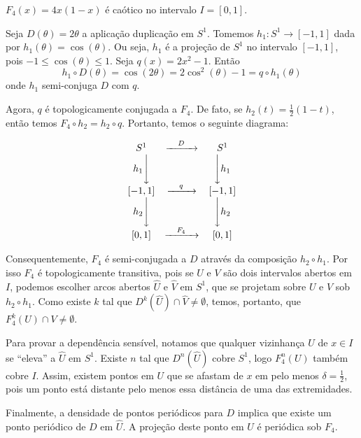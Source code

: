 \documentclass[../IC.tex]{subfiles}
\begin{document}
	\begin{teorema}
		$F_4(x)=4x(1-x)$ é caótico no intervalo $I=[0,1]$.
	\end{teorema}
	
	\begin{prova}
		Seja $D(\theta) = 2\theta$ a aplicação duplicação em $S^1$. Tomemos $h_1: S^1 \to [-1, 1]$ dada por $h_1(\theta) = \cos(\theta)$. Ou seja, $h_1$ é a projeção de $S^1$ no intervalo $[-1, 1]$, pois $-1\leq \cos(\theta) \leq 1$. Seja $q(x) = 2x^2 - 1$. Então
		$$ h_1 \circ D(\theta) = \cos(2\theta) = 2\cos^2(\theta) - 1 = q \circ h_1(\theta) $$
		onde $h_1$ semi-conjuga $D$ com $q$.
		
		Agora, $q$ é topologicamente conjugada a $F_4$. De fato, se $h_2(t) = \frac{1}{2}(1 - t)$, então temos $F_4 \circ h_2 = h_2 \circ q$. Portanto, temos o seguinte diagrama:
		
		$$
		\begin{array}{ccc}
			S^1 & \xrightarrow{\quad D \quad} & S^1 \\
			h_1 \Bigg\downarrow & & \Bigg\downarrow h_1 \\
			{[-1, 1]} & \xrightarrow{\quad q \quad} & {[-1, 1]} \\
			h_2 \Bigg\downarrow & & \Bigg\downarrow h_2 \\
			{[0, 1]} & \xrightarrow{\quad F_4 \quad} & {[0, 1]}
		\end{array}
		$$
		
		Consequentemente, $F_4$ é semi-conjugada a $D$ através da composição $h_2 \circ h_1$. Por isso $F_4$ é topologicamente transitiva, pois se $U$ e $V$ são dois intervalos abertos em $I$, podemos escolher arcos abertos $\hat{U}$ e $\hat{V}$ em $S^1$, que se projetam sobre $U$ e $V$ sob $h_2 \circ h_1$. Como existe $k$ tal que $D^k(\hat{U}) \cap \hat{V} \neq \emptyset$, temos, portanto, que $F_4^k(U) \cap V \neq \emptyset$.
		
		Para provar a dependência sensível, notamos que qualquer vizinhança $U$ de $x \in I$ se ``eleva'' a $\hat{U}$ em $S^1$. Existe $n$ tal que $D^n(\hat{U})$ cobre $S^1$, logo $F_4^n(U)$ também cobre $I$. Assim, existem pontos em $U$ que se afastam de $x$ em pelo menos $\delta = \frac{1}{2}$, pois um ponto está distante pelo menos essa distância de uma das extremidades. 
		
		Finalmente, a densidade de pontos periódicos para $D$ implica que existe um ponto periódico de $D$ em $\hat{U}$. A projeção deste ponto em $U$ é periódica sob $F_4$.
	\end{prova}
\end{document}
